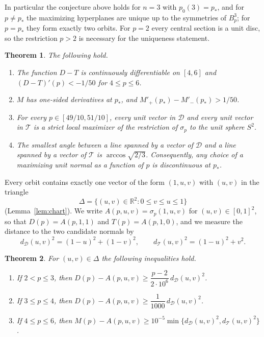 \documentclass[11pt]{amsart}
\newtheorem{theorem}{Theorem}[section]
\theoremstyle{definition}
\theoremstyle{remark}
\numberwithin{equation}{section}
\newcommand{\R}{\mathbb{R}}
\newcommand{\cD}{\mathcal{D}}
\newcommand{\cT}{\mathcal{T}}
\begin{document}
In particular the conjecture above holds for $n=3$ with $p_0(3)=p_*$, and for $p\ne p_*$ the maximizing hyperplanes are unique up to the symmetries of $B_p^3$; for $p=p_*$ they form exactly two orbits. For $p=2$ every central section is a unit disc, so the restriction $p>2$ is necessary for the uniqueness statement.

\begin{theorem}\label{thm:transition}
The following hold.
\begin{enumerate}[label=\textup{(\roman*)}]
\item The function $D-T$ is continuously differentiable on $[4,6]$ and $(D-T)'(p)<-1/50$ for $4\le p\le 6$.
\item $M$ has one-sided derivatives at $p_*$, and $M'_+(p_*)-M'_-(p_*)>1/50$.
\item For every $p\in[49/10,51/10]$, every unit vector in $\cD$ and every unit vector in $\cT$ is a strict local maximizer of the restriction of $\sigma_p$ to the unit sphere $S^2$.
\item The smallest angle between a line spanned by a vector of $\cD$ and a line spanned by a vector of $\cT$ is $\arccos\sqrt{2/3}$. Consequently, any choice of a maximizing unit normal as a function of $p$ is discontinuous at $p_*$.
\end{enumerate}
\end{theorem}

Every orbit contains exactly one vector of the form $(1,u,v)$ with $(u,v)$ in the triangle
\[
\Delta=\{(u,v)\in\R^2:0\le v\le u\le 1\}
\]
(Lemma~\ref{lem:chart}). We write $A(p,u,v)=\sigma_p(1,u,v)$ for $(u,v)\in[0,1]^2$, so that $D(p)=A(p,1,1)$ and $T(p)=A(p,1,0)$, and we measure the distance to the two candidate normals by
\[
d_\cD(u,v)^2=(1-u)^2+(1-v)^2,\qquad d_\cT(u,v)^2=(1-u)^2+v^2.
\]

\begin{theorem}\label{thm:stability}
For $(u,v)\in\Delta$ the following inequalities hold.
\begin{enumerate}[label=\textup{(\alph*)}]
\item If $2<p\le 3$, then $D(p)-A(p,u,v)\ge \dfrac{p-2}{2\cdot 10^{6}}\,d_\cD(u,v)^2$.
\item If $3\le p\le 4$, then $D(p)-A(p,u,v)\ge \dfrac{1}{1000}\,d_\cD(u,v)^2$.
\item If $4\le p\le 6$, then $M(p)-A(p,u,v)\ge 10^{-5}\min\{d_\cD(u,v)^2,d_\cT(u,v)^2\}$.
\end{enumerate}
\end{theorem}
\end{document}
